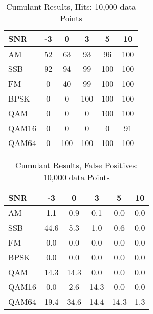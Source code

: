  
\begin{table}
\caption{Cumulant Results, Hits: 10,000 data Points}
\centering
\begin{tabular}{ l | c | c | c | c | c } \hline
SNR &	 -3 &	 0 &	 3 &	 5 &	 10\\ \hline \hline 
AM &	 52 &	 63 &	 93 &	 96 &	 100 \\ \hline 
 SSB &	 92 &	 94 &	 99 &	 100 &	 100 \\ \hline 
FM &	 0 &	 40 &	 99 &	 100 &	 100 \\ \hline 
BPSK &	 0 &	 0 &	 100 &	 100 &	 100 \\ \hline 
QAM &	 0 &	 0 &	 0 &	 100 &	 100 \\ \hline 
QAM16 &	 0 &	 0 &	 0 &	 0 &	 91 \\ \hline 
QAM64 &	 0 &	 100 &	 100 &	 100 &	 100 \\ \hline
\end{tabular}
\label{tab:cumHit10000pt}
\end{table}

\begin{table}
\caption{Cumulant Results, False Positives: 10,000 data Points}
\centering
\begin{tabular}{ l | c | c | c | c | c } \hline
SNR &	 -3 &	 0 &	 3 &	 5 &	 10 \\ \hline \hline
AM &	 1.1 &	 0.9 &	 0.1 &	 0.0 &	 0.0 \\ \hline 
 SSB &	 44.6 &	 5.3 &	 1.0 &	 0.6 &	 0.0 \\ \hline 
FM &	 0.0 &	 0.0 &	 0.0 &	 0.0 &	 0.0 \\ \hline 
BPSK &	 0.0 &	 0.0 &	 0.0 &	 0.0 &	 0.0 \\ \hline 
QAM &	 14.3 &	 14.3 &	 0.0 &	 0.0 &	 0.0 \\ \hline 
QAM16 &	 0.0 &	 2.6 &	 14.3 &	 0.0 &	 0.0 \\ \hline 
QAM64 &	 19.4 &	 34.6 &	 14.4 &	 14.3 &	 1.3 \\ \hline
\end{tabular}
\label{tab:cumFalsePositive10000pt}
\end{table}
 